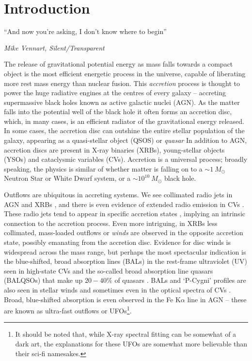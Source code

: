 \chapter{Introduction}

\epigraph{``And now you're asking, I don't know where to begin''}{{\sl Mike Vennart, Silent/Transparent}}
%

The release of gravitational potential energy as mass falls towards
a compact object is the most efficient energetic process in the universe,
capable of liberating more rest mass energy than nuclear fusion.
This {\em accretion} process is thought to power the huge radiative engines at the 
centres of every galaxy -- accreting supermassive black holes known as active galactic nuclei (AGN).
As the matter falls into the potential well of the black hole it often forms an accretion disc,
which, in many cases, is an efficient radiator of the gravitational energy released.
In some cases, the accretion disc can outshine the entire stellar population of the galaxy,
appearing as a quasi-stellar object (QSOS) or {\em quasar} 
In addition to AGN, accretion discs are present in X-ray binaries (XRBs), young-stellar objects (YSOs) and
cataclysmic variables (CVs). Accretion is a universal process; 
broadly speaking, the physics is similar of 
whether matter is falling on to a $\sim1~M_\odot$ Neutron Star or White Dwarf 
system, or a $\sim10^{10}~M_\odot$ black hole. 

Outflows are ubiquitous in accreting systems. We see collimated radio jets in AGN 
\citep{hazard1963,potash1980,perley1984,marscher2006} and XRBs \citep{bellonijet2010}, 
and there is even evidence of extended radio emission in CVs \citep{benz1983,coppejans2015}. 
These radio jets tend to appear in specific accretion states \citep{fender2001,kordingDNjet2008}, 
implying an intrinsic connection to the 
accretion process. Even more intriguing, in XRBs less collimated, mass-loaded outflows
or {\em winds} are observed in the opposite accretion state, possibly emanating from the accretion disc.
Evidence for disc winds is widespread across the mass range, but perhaps the most spectacular indication
is the blue-shifted, broad absorption lines (BALs) in the rest-frame ultraviolet (UV)
seen in high-state CVs \citep{heap1978,greensteinoke1982,cordova1982}
and the so-called broad absorption line quasars (BALQSOs) that make up $20-40\%$
of quasars \citep{weymann1991,knigge2008,allen2011}. 
BALs and `P-Cygni' profiles \citep{struve1935,rottenburg1952}
are also seen in stellar winds \citep[e.g.][]{cassinelli1979} and sometimes even
in the optical spectra of CVs \citep{patterson1996, RN98, kafka2004}. 
Broad, blue-shifted absorption is even observed in the Fe K$\alpha$ line in 
AGN \citep{reeves2003,poundsreeves2009,tombesi2010a} -- these are known
as ultra-fast outflows or UFOs\footnote{It should be noted that, while X-ray spectral
fitting can be somewhat of a dark art, the explanations for these
UFOs are somewhat more believable than their sci-fi namesakes.}.

